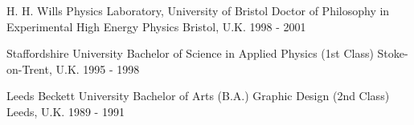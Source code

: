 

\begin{cventries}

    \award
    {H. H. Wills Physics Laboratory, University of Bristol} %
    {Doctor of Philosophy in Experimental High Energy Physics} %
    {Bristol, U.K.} %
    {1998 - 2001} %
    {}

    \award
    {Staffordshire University} %
    {Bachelor of Science in Applied Physics (1st Class)} %
    {Stoke-on-Trent, U.K.} %
    {1995 - 1998} %
    {}

    \award
    {Leeds Beckett University} %
    {Bachelor of Arts (B.A.) Graphic Design (2nd Class)} %
    {Leeds, U.K.} %
    {1989 - 1991} %
    {}

\end{cventries}